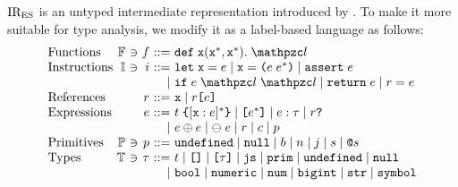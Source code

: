 ${\text{IR}_\text{ES}}$ is an untyped intermediate representation introduced by \citet{jiset}.
To make it more suitable for type analysis, we modify it as a label-based
language as follows:
\small
\[
  \begin{array}{l@{~}r@{~}c@{~}r@{~}r@{~}l}
    \text{Functions}
    &\funcset&\ni&\func&::=&\kwdef \; \x (\x^*, \x^*). \; \lab\\

    \text{Instructions}
    &\instset&\ni&\inst&::=&
    \kwlet \; \x = \expr \mid
    \x = \kwrl \expr \; \expr^* \kwrr \mid
    \kwassert \; \expr \\

    &&&&\mid&
    \kwif \; \expr \; \lab \; \lab \mid
    \kwreturn \; \expr \mid
    \refer = \expr \\

    \text{References}
    &&&\refer&::=&
    \x \mid
    \refer \kwsl \expr \kwsr \\

    \text{Expressions}
    &&&\expr&::=&
    \tname \; \kwcl [\x: \expr]^* \kwcr \mid
    \clist{\expr^*} \mid
    \expr: \ty \mid
    \refer \kwexists \\

    &&&&\mid&
    \expr \bop \expr \mid
    \uop \; \expr \mid
    \refer \mid
    \const \mid
    \prim \\

    \text{Primitives}
    &\primset&\ni&\prim&::=&
    \undefval \mid \nullval \mid \bool \mid
    \num \mid \bigint \mid \str \mid \symb \\

    \text{Types}
    &\tyset&\ni&\ty&::=&\tname \mid \clist{} \mid \clist{\ty} \mid \tjs \mid
    \tprim \mid \undefval \mid \nullval\\

    &&&&\mid&
    \tbool \mid \tnumeric \mid \tnum \mid \tbigint \mid \tstr \mid \tsymb \\
  \end{array}
\]

